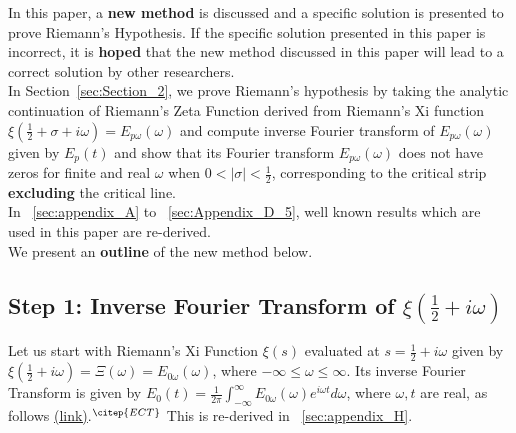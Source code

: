 \documentclass[11pt]{elsarticle}
\begin{document}
In this paper, a \textbf{new method} is discussed and a specific solution is presented to prove Riemann's Hypothesis. If the specific solution presented in this paper is incorrect, it is \textbf{hoped} that the new method discussed in this paper will lead to a correct solution by other researchers.\\



In Section~\ref{sec:Section_2}, we prove Riemann's hypothesis by taking the analytic continuation of Riemann's Zeta Function derived from Riemann's Xi function  $\xi(\frac{1}{2} + \sigma + i \omega)= E_{p\omega}(\omega)$ and compute inverse Fourier transform of $E_{p\omega}(\omega)$ given by $E_p(t)$ and show that its Fourier transform $E_{p\omega}(\omega)$ does not have zeros for finite and real $\omega$ when $0 < |\sigma| < \frac{1}{2}$, corresponding to the critical strip \textbf{excluding} the critical line.\\





In ~\ref{sec:appendix_A} to ~\ref{sec:Appendix_D_5}, well known results which are used in this paper are re-derived. \\

We present an \textbf{outline} of the new method below.

 

\subsection{\label{sec:Section_1_1} \textbf{Step 1: Inverse Fourier Transform of $\xi(\frac{1}{2} + i \omega)$ } \protect\\  \lowercase{} }


Let us start with Riemann's Xi Function $\xi(s)$ evaluated at $s = \frac{1}{2} + i \omega$ given by $\xi(\frac{1}{2} + i \omega)= \Xi(\omega) =  E_{0\omega}(\omega)$, where $-\infty \leq \omega \leq \infty$. Its inverse Fourier Transform is given by $ E_0(t)= \frac{1}{2 \pi}  \int_{-\infty}^{\infty} E_{0\omega}(\omega) e^{i\omega t} d\omega $, where $\omega, t$ are real, as follows \href{https://www.ams.org/notices/200303/fea-conrey-web.pdf#page=5}{(link)}.$^{\citep{ECT}}$ This is re-derived in ~\ref{sec:appendix_H}.
%
\end{document}

